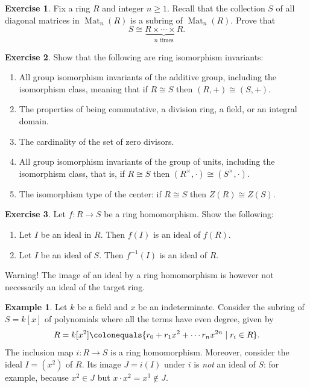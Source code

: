 \documentclass[12pt]{report}
\numberwithin{equation}{section}
\numberwithin{theorem}{chapter}
\theoremstyle{definition}
\newtheorem{example}[theorem]{Example}
\newtheorem{exercise}{Exercise}
\newtheorem*{basic properties}{Basic Properties}
\newtheorem*{Important Remark}{Important Remark}
\DeclareMathOperator{\Mat}{Mat}
\begin{document}
\begin{exercise} 
Fix a ring $R$ and integer $n \geqslant 1$. Recall that the collection $S$ of all diagonal matrices in $\Mat_{n}(R)$ is a subring of $\Mat_{n}(R)$. Prove that 
$$S \cong \underset{n \text{ times}}{\underbrace{R \times \cdots \times R}}.$$
\end{exercise}



\begin{exercise}
Show that the following are ring isomorphism invariants:
\begin{enumerate}[itemsep=0.1em]
\item All group isomorphism invariants of the additive group,  including the isomorphism class, meaning that if $R\cong S$ then $(R,+)\cong(S,+)$.
\item The properties of being commutative, a division ring, a field, or an integral domain.
\item The cardinality of the set of zero divisors. 
\item All group isomorphism invariants of the group of units, including the isomorphism class, that is, if $R\cong S$ then $(R^\times,\cdot)\cong(S^\times,\cdot)$.
\item The isomorphism type of the center: if $R\cong S$ then $Z(R)\cong Z(S)$.
\end{enumerate}
\end{exercise}


\begin{exercise}
	Let $f\!: R \to S$ be a ring homomorphism. Show the following:
	
	\begin{enumerate}[itemsep=-0.1em]
		\item Let $I$ be an ideal in $R$. Then $f(I)$ is an ideal of $f(R)$. 
		\item Let $I$ be an ideal of $S$. Then $f^{-1}(I)$ is an ideal of $R$.
	\end{enumerate}
\end{exercise}


Warning! The image of an ideal by a ring homomorphism is however not necessarily an ideal of the target ring.

\begin{example}
	Let $k$ be a field and $x$ be an indeterminate. Consider the subring of $S = k[x]$ of polynomials where all the terms have even degree, given by
	$$R = k[x^2] \colonequals \{ r_0 + r_1 x^2 + \cdots r_n x^{2n} \mid r_i \in R \}.$$
	The inclusion map $i\!: R \to S$ is a ring homomorphism. Moreover, consider the ideal $I = (x^2)$ of $R$. Its image $J = i(I)$ under $i$ is \emph{not} an ideal of $S$: for example, because $x^2 \in J$ but $x \cdot x^2 = x^3 \notin J$.
\end{example}
\end{document}
